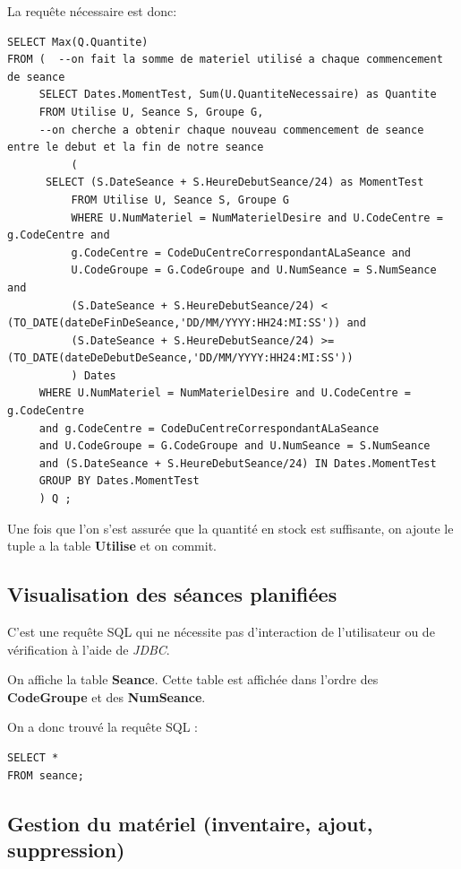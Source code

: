 \documentclass[10pt]{article}
\begin{document}
La requête nécessaire est donc:

\begin{small}
\begin{verbatim}
SELECT Max(Q.Quantite)
FROM ( 	--on fait la somme de materiel utilisé a chaque commencement de seance
     SELECT Dates.MomentTest, Sum(U.QuantiteNecessaire) as Quantite
     FROM Utilise U, Seance S, Groupe G, 
     --on cherche a obtenir chaque nouveau commencement de seance entre le debut et la fin de notre seance
          (
	  SELECT (S.DateSeance + S.HeureDebutSeance/24) as MomentTest
     	  FROM Utilise U, Seance S, Groupe G
     	  WHERE U.NumMateriel = NumMaterielDesire and U.CodeCentre = g.CodeCentre and 
     	  g.CodeCentre = CodeDuCentreCorrespondantALaSeance and
     	  U.CodeGroupe = G.CodeGroupe and U.NumSeance = S.NumSeance and 
     	  (S.DateSeance + S.HeureDebutSeance/24) < (TO_DATE(dateDeFinDeSeance,'DD/MM/YYYY:HH24:MI:SS')) and 
     	  (S.DateSeance + S.HeureDebutSeance/24) >= (TO_DATE(dateDeDebutDeSeance,'DD/MM/YYYY:HH24:MI:SS'))
     	  ) Dates
     WHERE U.NumMateriel = NumMaterielDesire and U.CodeCentre = g.CodeCentre 
     and g.CodeCentre = CodeDuCentreCorrespondantALaSeance
     and U.CodeGroupe = G.CodeGroupe and U.NumSeance = S.NumSeance 
     and (S.DateSeance + S.HeureDebutSeance/24) IN Dates.MomentTest
     GROUP BY Dates.MomentTest
     ) Q ;
\end{verbatim}
\end{small}

Une fois que l'on s'est assurée que la quantité en stock est suffisante, on ajoute le tuple a la table \textbf{Utilise} et
on commit.

\subsection{Visualisation des séances planifiées}

C'est une requête SQL qui ne nécessite pas d'interaction de l'utilisateur ou de vérification à l'aide de \emph{JDBC}.

On affiche la table \textbf{Seance}. Cette table est affichée dans l'ordre des \textbf{CodeGroupe} et des \textbf{NumSeance}.

On a donc trouvé la requête SQL :
\begin{small}
\begin{verbatim}
SELECT *
FROM seance;
\end{verbatim}
\end{small}

\subsection{Gestion du matériel (inventaire, ajout, suppression)}
\end{document}
